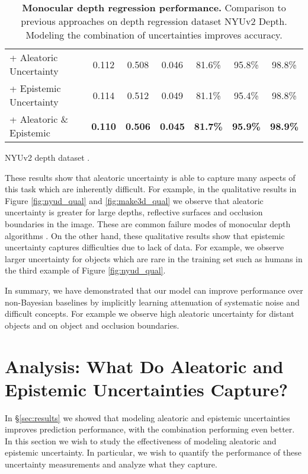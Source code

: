 \documentclass{article}
\begin{document}
\begin{table}[t]
\begin{subtable}[b]{.5\textwidth}
{\begin{tabular}{l|c|c|c|c|c|c}
+ Aleatoric Uncertainty & 0.112 & 0.508 & 0.046 & 81.6\% & 95.8\% & 98.8\% \\
+ Epistemic Uncertainty & 0.114 & 0.512 & 0.049 & 81.1\% & 95.4\% & 98.8\% \\
+ Aleatoric \& Epistemic & \textbf{0.110} & \textbf{0.506} & \textbf{0.045} & \textbf{81.7\%} & \textbf{95.9\%} & \textbf{98.9\%} \\
    \bottomrule
\end{tabular}
}
\caption{NYUv2 depth dataset \cite{silberman2012indoor}.}
\label{nyuv2depth}
\end{subtable}
\caption{\textbf{Monocular depth regression performance.} Comparison to previous approaches on depth regression dataset NYUv2 Depth. Modeling the combination of uncertainties improves accuracy.}
\vspace{-5mm}
\end{table}



These results show that aleatoric uncertainty is able to capture many aspects of this task which are inherently difficult. For example, in the qualitative results in Figure \ref{fig:nyud_qual} and \ref{fig:make3d_qual} we observe that aleatoric uncertainty is greater for large depths, reflective surfaces and occlusion boundaries in the image. These are common failure modes of monocular depth algorithms \cite{laina2016deeper}. On the other hand, these qualitative results show that epistemic uncertainty captures difficulties due to lack of data. For example, we observe larger uncertainty for objects which are rare in the training set such as humans in the third example of Figure \ref{fig:nyud_qual}.




In summary, we have demonstrated that our model can improve performance over non-Bayesian baselines by implicitly learning attenuation of systematic noise and difficult concepts. For example we observe high aleatoric uncertainty for distant objects and on object and occlusion boundaries.





\section{Analysis: What Do Aleatoric and Epistemic Uncertainties Capture?}

In \S\ref{sec:results} we showed that modeling aleatoric and epistemic uncertainties improves prediction performance, with the combination performing even better.
In this section we wish to study the effectiveness of modeling aleatoric and epistemic uncertainty. In particular, we wish to quantify the performance of these uncertainty measurements and analyze what they capture.
\end{document}
